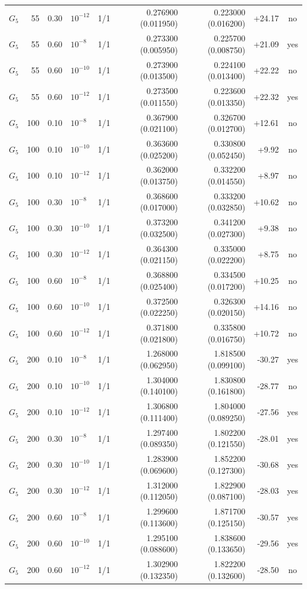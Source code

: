 \begin{longtable}{lrrlrrrrc}
$G_5$ & 55 & 0.30 & $10^{-12}$ & 1/1 & 0.276900 (0.011950) & 0.223000 (0.016200) & +24.17 & no\\
$G_5$ & 55 & 0.60 & $10^{-8}$ & 1/1 & 0.273300 (0.005950) & 0.225700 (0.008750) & +21.09 & yes\\
$G_5$ & 55 & 0.60 & $10^{-10}$ & 1/1 & 0.273900 (0.013500) & 0.224100 (0.013400) & +22.22 & no\\
$G_5$ & 55 & 0.60 & $10^{-12}$ & 1/1 & 0.273500 (0.011550) & 0.223600 (0.013350) & +22.32 & yes\\
$G_5$ & 100 & 0.10 & $10^{-8}$ & 1/1 & 0.367900 (0.021100) & 0.326700 (0.012700) & +12.61 & no\\
$G_5$ & 100 & 0.10 & $10^{-10}$ & 1/1 & 0.363600 (0.025200) & 0.330800 (0.052450) & +9.92 & no\\
$G_5$ & 100 & 0.10 & $10^{-12}$ & 1/1 & 0.362000 (0.013750) & 0.332200 (0.014550) & +8.97 & no\\
$G_5$ & 100 & 0.30 & $10^{-8}$ & 1/1 & 0.368600 (0.017000) & 0.333200 (0.032850) & +10.62 & no\\
$G_5$ & 100 & 0.30 & $10^{-10}$ & 1/1 & 0.373200 (0.032500) & 0.341200 (0.027300) & +9.38 & no\\
$G_5$ & 100 & 0.30 & $10^{-12}$ & 1/1 & 0.364300 (0.021150) & 0.335000 (0.022200) & +8.75 & no\\
$G_5$ & 100 & 0.60 & $10^{-8}$ & 1/1 & 0.368800 (0.025400) & 0.334500 (0.017200) & +10.25 & no\\
$G_5$ & 100 & 0.60 & $10^{-10}$ & 1/1 & 0.372500 (0.022250) & 0.326300 (0.020150) & +14.16 & no\\
$G_5$ & 100 & 0.60 & $10^{-12}$ & 1/1 & 0.371800 (0.021800) & 0.335800 (0.016750) & +10.72 & no\\
$G_5$ & 200 & 0.10 & $10^{-8}$ & 1/1 & 1.268000 (0.062950) & 1.818500 (0.099100) & -30.27 & yes\\
$G_5$ & 200 & 0.10 & $10^{-10}$ & 1/1 & 1.304000 (0.140100) & 1.830800 (0.161800) & -28.77 & no\\
$G_5$ & 200 & 0.10 & $10^{-12}$ & 1/1 & 1.306800 (0.111400) & 1.804000 (0.089250) & -27.56 & yes\\
$G_5$ & 200 & 0.30 & $10^{-8}$ & 1/1 & 1.297400 (0.089350) & 1.802200 (0.121550) & -28.01 & yes\\
$G_5$ & 200 & 0.30 & $10^{-10}$ & 1/1 & 1.283900 (0.069600) & 1.852200 (0.127300) & -30.68 & yes\\
$G_5$ & 200 & 0.30 & $10^{-12}$ & 1/1 & 1.312000 (0.112050) & 1.822900 (0.087100) & -28.03 & yes\\
$G_5$ & 200 & 0.60 & $10^{-8}$ & 1/1 & 1.299600 (0.113600) & 1.871700 (0.125150) & -30.57 & yes\\
$G_5$ & 200 & 0.60 & $10^{-10}$ & 1/1 & 1.295100 (0.088600) & 1.838600 (0.133650) & -29.56 & yes\\
$G_5$ & 200 & 0.60 & $10^{-12}$ & 1/1 & 1.302900 (0.132350) & 1.822200 (0.132600) & -28.50 & no\\
\end{longtable}
\endgroup
